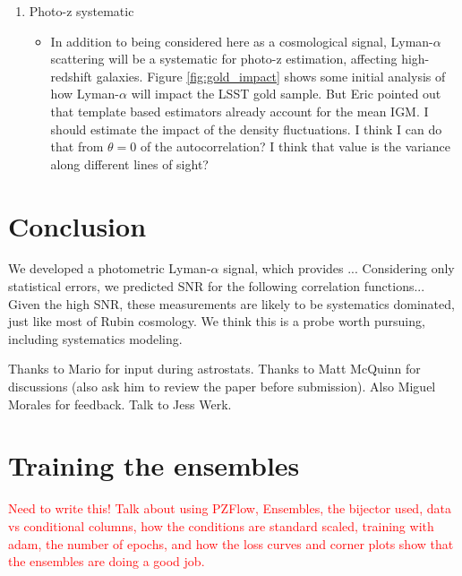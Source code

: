\documentclass[twocolumn]{aastex631}
\newcommand{\note}[1]{\textsf{\textcolor{red}{#1}}\xspace}
\newcommand{\lya}{Lyman-$\alpha$\xspace}
\begin{document}
\begin{enumerate}
    \item Photo-z systematic
    \begin{itemize}
        \item In addition to being considered here as a cosmological signal, \lya scattering will be a systematic for photo-z estimation, affecting high-redshift galaxies.
        Figure \ref{fig:gold_impact} shows some initial analysis of how \lya will impact the LSST gold sample.
        But Eric pointed out that template based estimators already account for the mean IGM.
        I should estimate the impact of the density fluctuations.
        I think I can do that from $\theta=0$ of the autocorrelation?
        I think that value is the variance along different lines of sight?
    \end{itemize}
\end{enumerate}


\section{Conclusion}
\label{sec:conclusion}

We developed a photometric \lya signal, which provides ...
Considering only statistical errors, we predicted SNR for the following correlation functions...
Given the high SNR, these measurements are likely to be systematics dominated, just like most of Rubin cosmology.
We think this is a probe worth pursuing, including systematics modeling.


\begin{acknowledgments}
    Thanks to Mario for input during astrostats.
    Thanks to Matt McQuinn for discussions (also ask him to review the paper before submission).
    Also Miguel Morales for feedback.
    Talk to Jess Werk.
\end{acknowledgments}


\appendix
\section{Training the ensembles}
\label{app:training}

\note{
    Need to write this!
    Talk about using PZFlow, Ensembles, the bijector used, data vs conditional columns, how the conditions are standard scaled, training with adam, the number of epochs, and how the loss curves and corner plots show that the ensembles are doing a good job.
}
\end{document}
